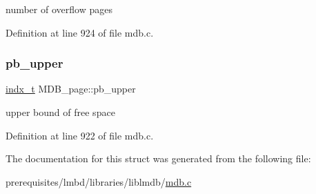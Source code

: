 number of overflow pages 

Definition at line 924 of file mdb.\+c.

\mbox{\label{struct_m_d_b__page_a1fd74cc370377addbb519ae429718b33}} 
\subsubsection{\texorpdfstring{pb\+\_\+upper}{pb\_upper}}
{\footnotesize\ttfamily \mbox{\hyperlink{group__internal_ga730e17f748208d77496ebd895c8375dc}{indx\+\_\+t}} M\+D\+B\+\_\+page\+::pb\+\_\+upper}

upper bound of free space 

Definition at line 922 of file mdb.\+c.



The documentation for this struct was generated from the following file\+:\begin{DoxyCompactItemize}
\item 
prerequisites/lmbd/libraries/liblmdb/\mbox{\hyperlink{mdb_8c}{mdb.\+c}}\end{DoxyCompactItemize}
